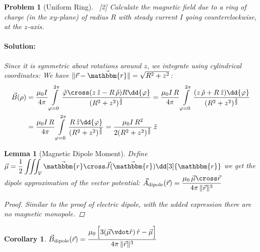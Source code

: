 \documentclass[12pt]{article}
\newcommand*{\rv}{\vec{r}}
\newcommand*{\ir}{\mathbbm{r}}
\newcommand*{\irv}{\vec{\mathbbm{r}}}
\newcommand*{\vB}{\vec{B}}
\newcommand*{\vJ}{\vec{J}}
\newcommand*{\mmu}{\mu_0}
\newcommand*{\vol}{\mathcal{V}}
\newtheorem{lemma}[theorem]{Lemma}
\newtheorem{corollary}[theorem]{Corollary}
\newtheorem{problem}[theorem]{Problem}
\newenvironment{solution}{\paragraph{Solution:}}{\hfill}
\begin{document}
\begin{problem}[Uniform Ring]
  $\,$
  [2]
  \noindent Calculate the magnetic field due to a ring of charge (in the $xy$-plane) of radius $R$ with steady current $I$ going counterclockwise, at the $z$-axis.
  \begin{solution}
    Since it is symmetric about rotations around $z$, we integrate using cylindrical coordinates: We have $\|\rv-\irv\|=\sqrt{R^2+z^2}$:
    \begin{align*}
      \vec{B}(\rho)&=\frac{\mmu I}{4\pi}\int\limits_{\varphi=0}^{2\pi}\frac{\hat{\varphi}\cross(z\,\hat{z}-R\,\hat{\rho})R\dd{\varphi}}{(R^2+z^2)^{3\over 2}}=\frac{\mmu I\,R}{4\pi}\int\limits_{\varphi=0}^{2\pi}\frac{(z\,\hat{\rho}+R\,\hat{z})\dd{\varphi}}{(R^2+z^2)^{3\over 2}}\\
      &=\frac{\mmu I\,R}{4\pi}\int\limits_{\varphi=0}^{2\pi}\frac{R\,\hat{z}\dd{\varphi}}{(R^2+z^2)^{3\over 2}}=\frac{\mmu I\,R^2}{2(R^2+z^2)^{3\over 2}}\,\hat{z}
    \end{align*}
  \end{solution}
\end{problem}

\begin{lemma}[Magnetic Dipole Moment]
  Define $\displaystyle\vec{\mu}=\frac{1}{2}\iiint_{\vol}\irv\cross\vJ(\irv)\dd[3]{\ir}$ we get the dipole approximation of the vector potential: $\vec{A}_\text{dipole}(\rv)=\dfrac{\mmu\,\vec{\mu}\cross\rv}{4\pi\,\|\rv\|^3}$
  \begin{proof}
    Similar to the proof of electric dipole, with the added expression there are no magnetic monopole.
  \end{proof}
\end{lemma}

\begin{corollary}
  $\displaystyle\vB_\text{dipole}(\rv)=\dfrac{\mmu\,\Big[3(\vec{\mu}\vdot\hat{r})\,\hat{r}-\vec{\mu}\Big]}{4\pi\,\|\rv\|^3}$
\end{corollary}
\end{document}
